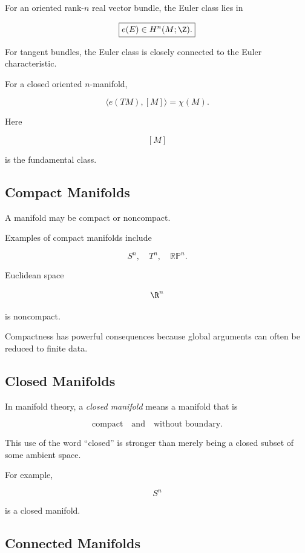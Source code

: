 For an oriented rank-\(n\) real vector bundle, the Euler class lies in

\[
\boxed{
e(E)\in H^n(M;\Z).
}
\]

For tangent bundles, the Euler class is closely connected to the Euler
characteristic.

For a closed oriented \(n\)-manifold,

\[
\boxed{
\langle e(TM),[M]\rangle
=
\chi(M).
}
\]

Here

\[
[M]
\]

is the fundamental class.

\subsection{Compact Manifolds}
\label{subsec:compact-manifolds}

A manifold may be compact or noncompact.

Examples of compact manifolds include

\[
\boxed{
S^n,
\quad
T^n,
\quad
\mathbb{RP}^n.
}
\]

Euclidean space

\[
\R^n
\]

is noncompact.

Compactness has powerful consequences because global arguments can often be
reduced to finite data.

\subsection{Closed Manifolds}
\label{subsec:closed-manifolds}

In manifold theory, a \emph{closed manifold} means a manifold that is

\[
\boxed{
\text{compact}
\quad\text{and}\quad
\text{without boundary}.
}
\]

This use of the word ``closed'' is stronger than merely being a closed
subset of some ambient space.

For example,

\[
\boxed{
S^n
}
\]

is a closed manifold.

\subsection{Connected Manifolds}
\label{subsec:connected-manifolds}

